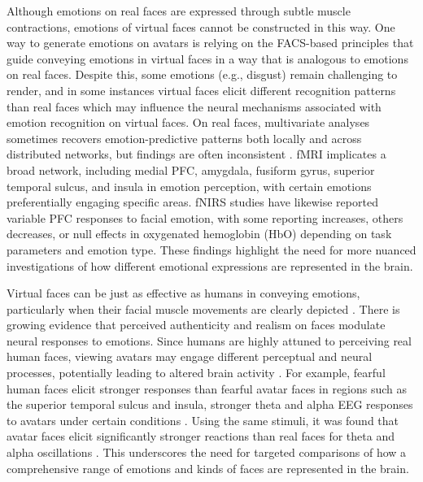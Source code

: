 Although emotions on real faces are expressed through subtle muscle contractions, emotions of virtual faces cannot be constructed in this way. 
One way to generate emotions on avatars is relying on the FACS-based principles that guide conveying emotions in virtual faces in a way that is analogous to emotions on real faces. 
Despite this, some emotions (e.g., disgust) remain challenging to render, and in some instances virtual faces elicit different recognition patterns than real faces \citep{garcia_design_2020, dyck_recognition_2008, de_paolis_perception_2015} which may influence the neural mechanisms associated with emotion recognition on virtual faces. 
On real faces, multivariate analyses sometimes recovers emotion-predictive patterns both locally and across distributed networks, but findings are often inconsistent \citep{kragel_decoding_2016, westgarth_systematic_2021, bendall_brief_2016}.
fMRI implicates a broad network, including medial PFC, amygdala, fusiform gyrus, superior temporal sulcus, and insula in emotion perception, with certain emotions preferentially engaging specific areas. 
fNIRS studies have likewise reported variable PFC responses to facial emotion, with some reporting increases, others decreases, or null effects in oxygenated hemoglobin (HbO) depending on task parameters and emotion type.
These findings highlight the need for more nuanced investigations of how different emotional expressions are represented in the brain.

Virtual faces can be just as effective as humans in conveying emotions, particularly when their facial muscle movements are clearly depicted \citep{hortensius_perception_2018}.
There is growing evidence that perceived authenticity and realism on faces modulate neural responses to emotions.
Since humans are highly attuned to perceiving real human faces, viewing avatars may engage different perceptual and neural processes, potentially leading to altered brain activity \citep{de_borst_is_2015}. 
For example, fearful human faces elicit stronger responses than fearful avatar faces in regions such as the superior temporal sulcus and insula, stronger theta and alpha EEG responses to avatars under certain conditions \citep{kegel_dynamic_2020}.
Using the same stimuli, it was found that avatar faces elicit significantly stronger reactions than real faces for theta and alpha oscillations \citep{sollfrank_effects_2021}.
This underscores the need for targeted comparisons of how a comprehensive range of emotions and kinds of faces are represented in the brain. 

